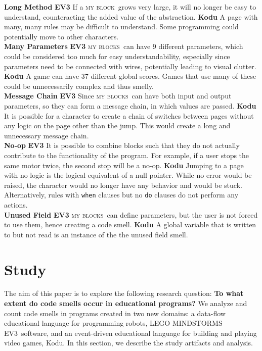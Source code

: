 \documentclass[conference]{IEEEtran}
\newcommand{\ms}{LEGO MINDSTORMS EV3}
\newcommand{\mbs}{\textsc{my blocks}}
\newcommand{\mb}{\textsc{my block}}
\begin{document}
\textbf{Long Method} \textbf{EV3} If a \mb~grows very large, it will no longer be easy to understand, counteracting the added value of the abstraction. \textbf{Kodu} A page with many, many rules may be difficult to understand. Some programming could potentially move to other characters.\\
\textbf{Many Parameters} \textbf{EV3} \mbs~can have 9 different parameters, which could be considered too much for easy understandability, especially since parameters need to be connected with wires, potentially leading to visual clutter. \textbf{Kodu} A game can have 37 different global scores. Games that use many of these could be unnecessarily complex and thus smelly.\\
\textbf{Message Chain} \textbf{EV3} Since \mbs~can have both input and output parameters, so they can form a message chain, in which values are passed. \textbf{Kodu} It is possible for a character to create a chain of switches between pages without any logic on the page other than the jump. This would create a long and unnecessary message chain.\\
\textbf{No-op} \textbf{EV3} It is possible to combine blocks such that they do not actually contribute to the functionality of the program. For example, if a user stops the same motor twice, the second stop will be a no-op. \textbf{Kodu} Jumping to a page with no logic is the logical equivalent of a null pointer. While no error would be raised, the character would no longer have any behavior and would be stuck. Alternatively, rules with {\tt when} clauses but no {\tt do} clauses do not perform any actions.\\
\textbf{Unused Field} \textbf{EV3} \mbs~can define parameters, but the user is not forced to use them, hence creating a code smell.  \textbf{Kodu} A global variable that is written to but not read is an instance of the the unused field smell.\\


\section{Study}
\label{sec:study}
The aim of this paper is to explore the following research question: \textbf{To what extent do code smells occur in educational programs?} 
We analyze and count code smells in programs created in two new domains: a data-flow educational language for programming robots, \ms~software,  and an event-driven educational language for building and playing video games, Kodu. 
In this section, we describe the study artifacts and analysis. 
\end{document}
